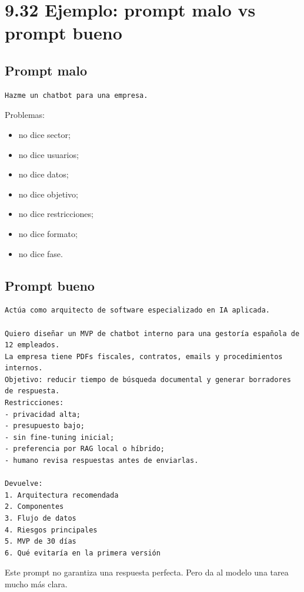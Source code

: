 \section{9.32 Ejemplo: prompt malo vs prompt
bueno}\label{ejemplo-prompt-malo-vs-prompt-bueno}

\subsection{Prompt malo}\label{prompt-malo}

\begin{lstlisting}
Hazme un chatbot para una empresa.
\end{lstlisting}

Problemas:

\begin{itemize}
\tightlist
\item
  no dice sector;
\item
  no dice usuarios;
\item
  no dice datos;
\item
  no dice objetivo;
\item
  no dice restricciones;
\item
  no dice formato;
\item
  no dice fase.
\end{itemize}

\subsection{Prompt bueno}\label{prompt-bueno}

\begin{lstlisting}
Actúa como arquitecto de software especializado en IA aplicada.

Quiero diseñar un MVP de chatbot interno para una gestoría española de 12 empleados.
La empresa tiene PDFs fiscales, contratos, emails y procedimientos internos.
Objetivo: reducir tiempo de búsqueda documental y generar borradores de respuesta.
Restricciones:
- privacidad alta;
- presupuesto bajo;
- sin fine-tuning inicial;
- preferencia por RAG local o híbrido;
- humano revisa respuestas antes de enviarlas.

Devuelve:
1. Arquitectura recomendada
2. Componentes
3. Flujo de datos
4. Riesgos principales
5. MVP de 30 días
6. Qué evitaría en la primera versión
\end{lstlisting}

Este prompt no garantiza una respuesta perfecta. Pero da al modelo una
tarea mucho más clara.

